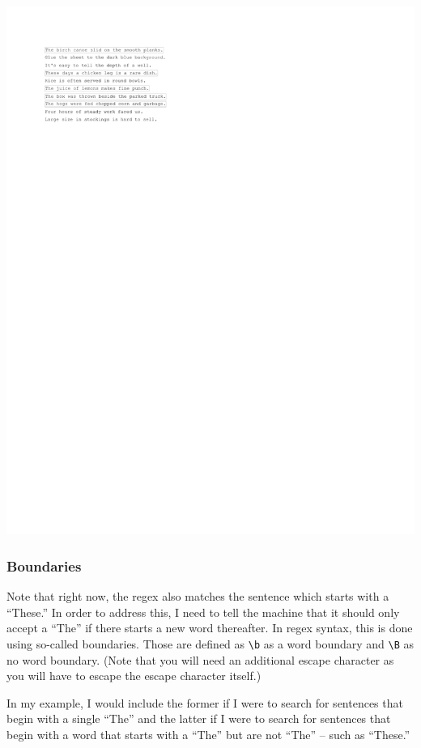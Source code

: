\documentclass[
]{book}
\begin{document}
\includegraphics{_main_files/figure-latex/unnamed-chunk-36-1.pdf}

\hypertarget{boundaries}{%
\subsubsection{Boundaries}\label{boundaries}}

Note that right now, the regex also matches the sentence which starts with a ``These.'' In order to address this, I need to tell the machine that it should only accept a ``The'' if there starts a new word thereafter. In regex syntax, this is done using so-called boundaries. Those are defined as \texttt{\textbackslash{}b} as a word boundary and \texttt{\textbackslash{}B} as no word boundary. (Note that you will need an additional escape character as you will have to escape the escape character itself.)

In my example, I would include the former if I were to search for sentences that begin with a single ``The'' and the latter if I were to search for sentences that begin with a word that starts with a ``The'' but are not ``The'' -- such as ``These.''
\end{document}
